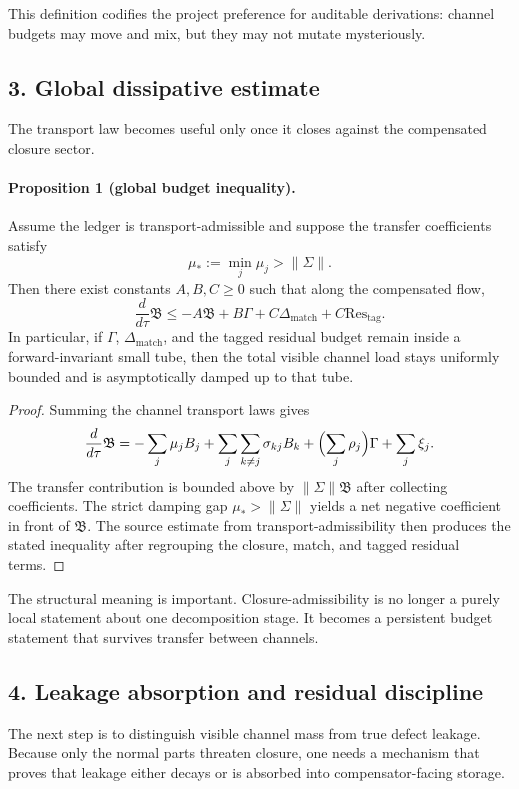 This definition codifies the project preference for auditable derivations: channel
budgets may move and mix, but they may not mutate mysteriously.

\subsection*{3. Global dissipative estimate}
The transport law becomes useful only once it closes against the compensated
closure sector.

\paragraph{Proposition 1 (global budget inequality).}
Assume the ledger is transport-admissible and suppose the transfer coefficients
satisfy
\[
\mu_* := \min_j \mu_j > \|\Sigma\|.
\]
Then there exist constants $A,B,C\ge0$ such that along the compensated flow,
\[
\frac{d}{d\tau}\mathfrak B
\le -A\mathfrak B + B\Gamma + C\Delta_{\mathrm{match}} + C\mathrm{Res}_{\mathrm{tag}}.
\]
In particular, if $\Gamma$, $\Delta_{\mathrm{match}}$, and the tagged residual budget
remain inside a forward-invariant small tube, then the total visible channel load
stays uniformly bounded and is asymptotically damped up to that tube.

\begin{proof}
Summing the channel transport laws gives
\[
\frac{d}{d\tau}\mathfrak B
= -\sum_j \mu_j B_j + \sum_j\sum_{k\neq j}\sigma_{kj}B_k
+ \Bigl(\sum_j \rho_j\Bigr)\Gamma + \sum_j \xi_j.
\]
The transfer contribution is bounded above by $\|\Sigma\|\mathfrak B$ after
collecting coefficients. The strict damping gap $\mu_*>\|\Sigma\|$ yields a net
negative coefficient in front of $\mathfrak B$. The source estimate from
transport-admissibility then produces the stated inequality after regrouping the
closure, match, and tagged residual terms.
\end{proof}

The structural meaning is important. Closure-admissibility is no longer a purely
local statement about one decomposition stage. It becomes a persistent budget
statement that survives transfer between channels.

\subsection*{4. Leakage absorption and residual discipline}
The next step is to distinguish visible channel mass from true defect leakage.
Because only the normal parts threaten closure, one needs a mechanism that proves
that leakage either decays or is absorbed into compensator-facing storage.

